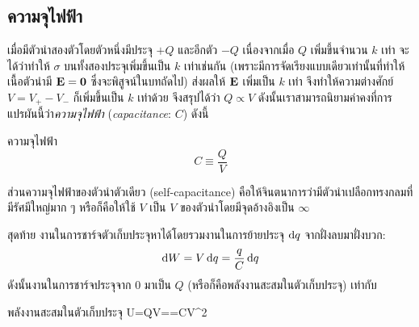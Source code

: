 \subsection{ความจุไฟฟ้า}
เมื่อมีตัวนำสองตัวโดยตัวหนึ่งมีประจุ $+Q$ และอีกตัว $-Q$ เนื่องจากเมื่อ $Q$ เพิ่มขึ้นจำนวน $k$ เท่า จะได้ว่าทำให้ $\sigma$ บนทั้งสองประจุเพิ่มขึ้นเป็น $k$ เท่าเช่นกัน (เพราะมีการจัดเรียงแบบเดียวเท่านั้นที่ทำให้เนื้อตัวนำมี $\mathbf{E}=\mathbf{0}$ ซึ่งจะพิสูจน์ในบทถัดไป) ส่งผลให้ $\mathbf{E}$ เพิ่มเป็น $k$ เท่า จึงทำให้ความต่างศักย์ $V=V_{+}-V_-$ ก็เพิ่มขึ้นเป็น $k$ เท่าด้วย จึงสรุปได้ว่า $Q\propto V$ ดังนั้นเราสามารถนิยามค่าคงที่การแปรผันนี้ว่า\emph{ความจุไฟฟ้า} (\emph{capacitance}: $C$) ดังนี้
\begin{defbox}{ความจุไฟฟ้า}
    \begin{equation}
        C\equiv\frac{Q}{V}
    \end{equation}
\end{defbox}
ส่วนความจุไฟฟ้าของตัวนำตัวเดียว (self-capacitance) คือให้จินตนาการว่ามีตัวนำเปลือกทรงกลมที่มีรัศมีใหญ่มาก ๆ หรือก็คือให้ใช้ $V$ เป็น $V$ ของตัวนำโดยมีจุดอ้างอิงเป็น $\infty$

สุดท้าย งานในการชาร์จตัวเก็บประจุหาได้โดยรวมงานในการย้ายประจุ $\odif{q}$ จากฝั่งลบมาฝั่งบวก:
\[ 
\odif{W}=V\odif{q}=\frac{q}{C}\odif{q}
\]
ดังนั้นงานในการชาร์จประจุจาก $0$ มาเป็น $Q$ (หรือก็คือพลังงานสะสมในตัวเก็บประจุ) เท่ากับ
\begin{ieqbox}{พลังงานสะสมในตัวเก็บประจุ}
    U=QV==CV^2
\end{ieqbox}